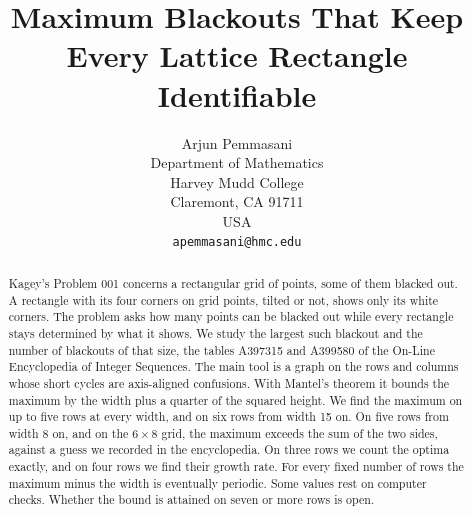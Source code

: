 \documentclass[12pt]{article}
\title{Maximum Blackouts That Keep Every Lattice Rectangle Identifiable}
\author{Arjun Pemmasani\\
Department of Mathematics\\
Harvey Mudd College\\
Claremont, CA 91711\\
USA\\
\texttt{apemmasani@hmc.edu}}
\date{}
\theoremstyle{plain}
\theoremstyle{definition}
\theoremstyle{remark}
\begin{document}
\maketitle

\begin{abstract}
Kagey's Problem 001 concerns a rectangular grid of points, some of them blacked out. A
rectangle with its four corners on grid points, tilted or not, shows only its white
corners. The problem asks how many points can be blacked out while every rectangle stays
determined by what it shows. We study the largest such blackout and the number of
blackouts of that size, the tables A397315 and A399580 of the On-Line Encyclopedia of
Integer Sequences. The main tool is a graph on the rows and columns whose short cycles
are axis-aligned confusions. With Mantel's theorem it bounds the maximum by the width
plus a quarter of the squared height. We find the maximum on up to five rows at every
width, and on six rows from width 15 on. On five rows from width 8 on, and on the
$6\times8$ grid, the maximum exceeds the sum of the two sides, against a guess we
recorded in the encyclopedia. On three rows we count the optima exactly, and on four
rows we find their growth rate. For every fixed number of rows the maximum minus the
width is eventually periodic. Some values rest on computer checks. Whether the bound is
attained on seven or more rows is open.
\end{abstract}













\appendix

\end{document}
